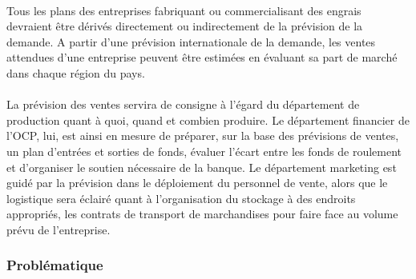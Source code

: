 	\paragraph*{}
	Tous les plans des entreprises fabriquant ou commercialisant des engrais devraient être dérivés directement ou indirectement de la prévision de la demande. A partir d'une prévision internationale de la demande, les ventes attendues d'une entreprise peuvent être estimées en évaluant sa part de marché dans chaque région du pays.
	\paragraph{}
	La prévision des ventes servira de consigne à l’égard du département de production quant à quoi, quand et combien produire. Le département financier de l'OCP, lui, est ainsi en mesure de préparer, sur la base des prévisions de ventes, un plan d'entrées et sorties de fonds, évaluer l'écart entre les fonds de roulement et d'organiser le soutien nécessaire de la banque. Le département marketing est guidé par la prévision dans le déploiement du personnel de vente, alors que le logistique sera éclairé quant à l’organisation du stockage à des endroits appropriés, les contrats de transport de marchandises pour faire face au volume prévu de l'entreprise.
	\subsubsection{Problématique}
	
